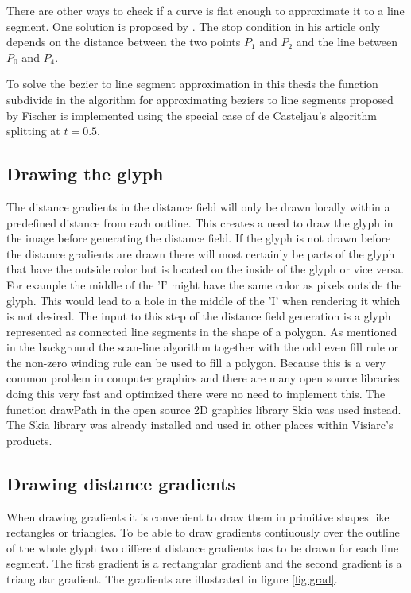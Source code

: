 There are other ways to check if a curve is flat enough to approximate it to a line segment. One solution is proposed by \citet{bezier_subdivision}. The stop condition in his article only depends on the distance between the two points $P_1$ and $P_2$ and the line between $P_0$ and $P_4$.

To solve the bezier to line segment approximation in this thesis the function subdivide in the algorithm for approximating beziers to line segments proposed by Fischer is implemented using the special case of de Casteljau's algorithm splitting at $t=0.5$.  
\subsection{Drawing the glyph}
The distance gradients in the distance field will only be drawn locally within a predefined distance from each outline. This creates a need to draw the glyph in the image before generating the distance field. If the glyph is not drawn before the distance gradients are drawn there will most certainly be parts of the glyph that have the outside color but is located on the inside of the glyph or vice versa. For example the middle of the 'I' might have the same color as pixels outside the glyph. This would lead to a hole in the middle of the 'I' when rendering it which is not desired. The input to this step of the distance field generation is a glyph represented as connected line segments in the shape of a polygon. As mentioned in the background the scan-line algorithm together with the odd even fill rule or the non-zero winding rule can be used to fill a polygon. Because this is a very common problem in computer graphics and there are many open source libraries doing this very fast and optimized there were no need to implement this. The function drawPath in the open source 2D graphics library Skia was used instead. The Skia library was already installed and used in other places within Visiarc's products.
\subsection{Drawing distance gradients}
When drawing gradients it is convenient to draw them in primitive shapes like rectangles or triangles. To be able to draw gradients contiuously over the outline of the whole glyph two different distance gradients has to be drawn for each line segment. The first gradient is a rectangular gradient and the second gradient is a triangular gradient. The gradients are illustrated in figure \ref{fig:grad}.

